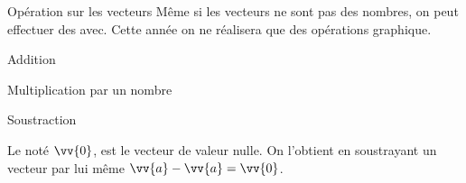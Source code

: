 \begin{doc}{Opération sur les vecteurs}
  Même si les vecteurs ne sont pas des nombres, on peut effectuer des  avec.
  Cette année on ne réalisera que des opérations graphique.
  \begin{multicols}{3}
    \centering
    \begin{boite} \vAligne{50pt} \end{boite}
    Addition
    
    \begin{boite} \vAligne{50pt} \end{boite}
    Multiplication par un nombre

    \begin{boite} \vAligne{50pt} \end{boite}
    Soustraction
  \end{multicols}

  \begin{importants}
    Le  noté $\vv{0}$, est le vecteur de valeur nulle.
    On l'obtient en soustrayant un vecteur par lui même $\vv{a} - \vv{a} = \vv{0}$.
  \end{importants}
\end{doc}
